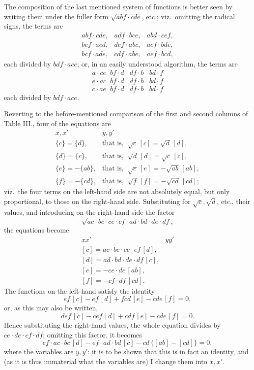 \documentclass[11pt,a4paper]{article}
\begin{document}
The composition of the last mentioned system of functions is better seen by writing them under the fuller form $\sqrt{abf \cdot cde}$, etc.; viz.\ omitting the radical signs, the terms are
\[
\begin{array}{lll}
abf \cdot cde, & adf \cdot bce, & abd \cdot cef,\\
bef \cdot acd, & def \cdot abc, & acf \cdot bde,\\
bcf \cdot ade, & cdf \cdot abe, & aef \cdot bcd,
\end{array}
\]
each divided by $bdf \cdot ace$; or, in an easily understood algorithm, the terms are
\[
\begin{array}{lll}
a \cdot ce\;\; bf \cdot d & df \cdot b & bd \cdot f\\
e \cdot ac\;\; bf \cdot d & df \cdot b & bd \cdot f\\
c \cdot ae\;\; bf \cdot d & df \cdot b & bd \cdot f
\end{array}
\]
each divided by $bdf \cdot ace$.

\newpage


\noindent Reverting to the before-mentioned comparison of the first and second columns of Table III., four of the equations are
\[
\begin{array}{ll}
x, x' & y, y'\\
\{c\} = \{d\}, & \text{that is,}\;\;\sqrt{c}\,[c] = \sqrt{d}\,[d],\\
\{d\} = \{c\}, & \text{that is,}\;\;\sqrt{d}\,[d] = \sqrt{c}\,[c],\\
\{e\} = -\{ab\}, & \text{that is,}\;\;\sqrt{e}\,[e] = -\sqrt{ab}\,[ab],\\
\{f\} = -\{cd\}, & \text{that is,}\;\;\sqrt{f}\,[f] = -\sqrt{cd}\,[cd];
\end{array}
\]
viz.\ the four terms on the left-hand side are not absolutely equal, but only proportional, to those on the right-hand side. Substituting for $\sqrt{c}, \sqrt{d}$, etc., their values, and introducing on the right-hand side the factor
\[
\sqrt{ac \cdot bc \cdot ce \cdot cf \cdot ad \cdot bd \cdot de \cdot df},
\]
the equations become
\[
\begin{array}{ll}
xx' & yy'\\
{[c]} = ac \cdot bc \cdot ce \cdot ef\,[d],\\
{[d]} = ad \cdot bd \cdot de \cdot df\,[c],\\
{[e]} = -ce \cdot de\,[ab],\\
{[f]} = -cf \cdot df\,[cd].
\end{array}
\]
The functions on the left-hand satisfy the identity
\[
ef\,[c] - ef\,[d] + fcd\,[e] - cde\,[f] = 0,
\]
or, as this may also be written,
\[
def\,[c] - cef\,[d] + cdf\,[e] - cde\,[f] = 0.
\]
Hence substituting the right-hand values, the whole equation divides by $ce \cdot de \cdot cf \cdot df$; omitting this factor, it becomes
\[
ef \cdot ac \cdot bc\,[d] - ef \cdot ad \cdot bd\,[c] - cd\,\{[ab] - [cd]\} = 0,
\]
where the variables are $y, y'$: it is to be shown that this is in fact an identity, and (as it is thus immaterial what the variables are) I change them into $x, x'$.
\end{document}
